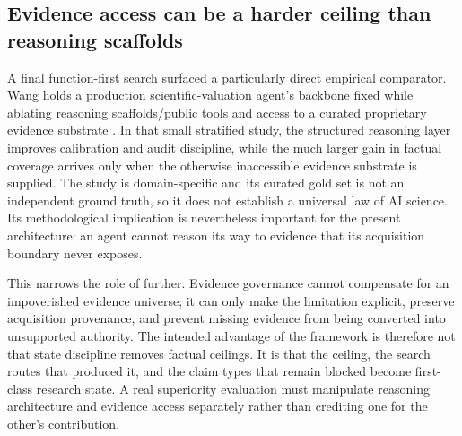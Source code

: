 \subsection{Evidence access can be a harder ceiling than reasoning scaffolds}

A final function-first search surfaced a particularly direct empirical comparator. Wang holds a production scientific-valuation agent's backbone fixed while ablating reasoning scaffolds/public tools and access to a curated proprietary evidence substrate \cite{wang2026evidence}. In that small stratified study, the structured reasoning layer improves calibration and audit discipline, while the much larger gain in factual coverage arrives only when the otherwise inaccessible evidence substrate is supplied. The study is domain-specific and its curated gold set is not an independent ground truth, so it does not establish a universal law of AI science. Its methodological implication is nevertheless important for the present architecture: an agent cannot reason its way to evidence that its acquisition boundary never exposes.

This narrows the role of \RAKL{} further. Evidence governance cannot compensate for an impoverished evidence universe; it can only make the limitation explicit, preserve acquisition provenance, and prevent missing evidence from being converted into unsupported authority. The intended advantage of the framework is therefore not that state discipline removes factual ceilings. It is that the ceiling, the search routes that produced it, and the claim types that remain blocked become first-class research state. A real superiority evaluation must manipulate reasoning architecture and evidence access separately rather than crediting one for the other's contribution.
